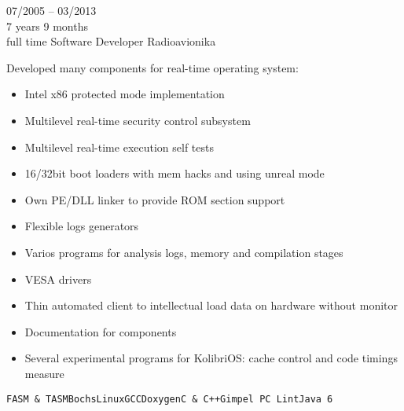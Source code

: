 \begin{entrylist}
    \entry
    {07/2005 -- 03/2013\\\footnotesize{7 years 9 months\\full time}}
    {Software Developer}
    {Radioavionika}
    {
        Developed many components for real-time operating system:
        \begin{itemize}[leftmargin=.2in]
        	\setlength\itemsep{0em}
            \item Intel x86 protected mode implementation
            \item Multilevel real-time security control subsystem
            \item Multilevel real-time execution self tests
            \item 16/32bit boot loaders with mem hacks and using unreal mode
            \item Own PE/DLL linker to provide ROM section support
            \item Flexible logs generators
            \item Varios programs for analysis logs, memory and compilation stages
            \item VESA drivers
            \item Thin automated client to intellectual load data on hardware without monitor
            \item Documentation for components
            \item Several experimental programs for KolibriOS: cache control and code timings measure
        \end{itemize}
    \texttt{FASM \& TASM}\slashsep\texttt{Bochs}\slashsep\texttt{Linux}\slashsep\texttt{GCC}\slashsep\texttt{Doxygen}\slashsep\texttt{C \& C++}\slashsep\texttt{Gimpel PC Lint}\slashsep\texttt{Java 6}}

\end{entrylist}

